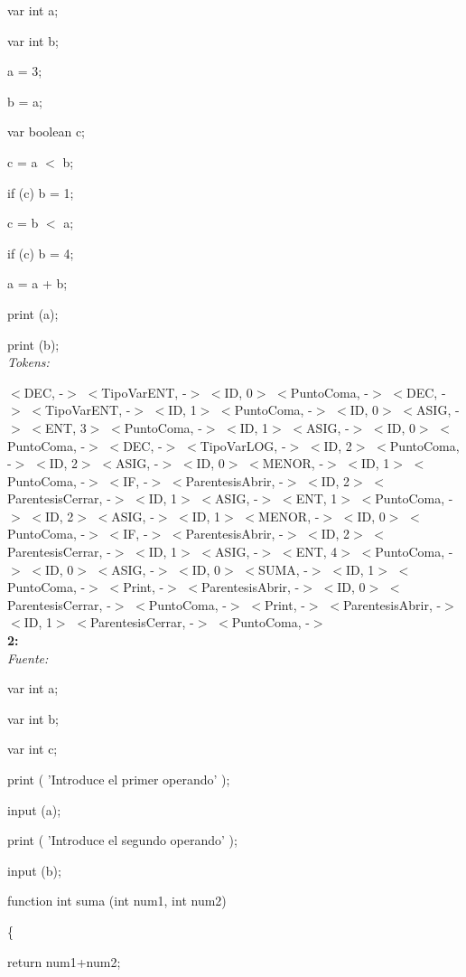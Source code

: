 \documentclass[a4paper, 12pt]{article}
\begin{document}
var int a;
 
var int b;

a = 3;

b = a;

 var boolean c;
 
c = a  $<$  b;

if (c) b  =  1;

c = b  $<$  a;

if (c) b  =  4;

 a = a  +  b;
 
print (a);

print (b);\medskip \\
\emph{Tokens:}

\smallskip 
 $<$DEC, -$>$ 
 $<$TipoVarENT, -$>$ 
 $<$ID, 0$>$ 
 $<$PuntoComa, -$>$ 
 $<$DEC, -$>$
 $<$TipoVarENT, -$>$ 
 $<$ID, 1$>$ 
 $<$PuntoComa, -$>$ 
 $<$ID, 0$>$ 
 $<$ASIG, -$>$ 
 $<$ENT, 3$>$ 
 $<$PuntoComa, -$>$ 
 $<$ID, 1$>$ 
 $<$ASIG, -$>$ 
 $<$ID, 0$>$ 
 $<$PuntoComa, -$>$ 
 $<$DEC, -$>$ 
 $<$TipoVarLOG, -$>$ 
 $<$ID, 2$>$ 
 $<$PuntoComa, -$>$ 
 $<$ID, 2$>$ 
 $<$ASIG, -$>$ 
 $<$ID, 0$>$ 
 $<$MENOR, -$>$ 
 $<$ID, 1$>$ 
 $<$PuntoComa, -$>$ 
 $<$IF, -$>$ 
 $<$ParentesisAbrir, -$>$ 
 $<$ID, 2$>$ 
 $<$ParentesisCerrar, -$>$ 
 $<$ID, 1$>$ 
 $<$ASIG, -$>$ 
 $<$ENT, 1$>$ 
 $<$PuntoComa, -$>$ 
 $<$ID, 2$>$ 
 $<$ASIG, -$>$ 
 $<$ID, 1$>$ 
 $<$MENOR, -$>$ 
 $<$ID, 0$>$ 
 $<$PuntoComa, -$>$ 
 $<$IF, -$>$ 
 $<$ParentesisAbrir, -$>$ 
 $<$ID, 2$>$ 
 $<$ParentesisCerrar, -$>$ 
 $<$ID, 1$>$ 
 $<$ASIG, -$>$ 
 $<$ENT, 4$>$ 
 $<$PuntoComa, -$>$ 
 $<$ID, 0$>$ 
 $<$ASIG, -$>$ 
 $<$ID, 0$>$ 
 $<$SUMA, -$>$ 
 $<$ID, 1$>$ 
 $<$PuntoComa, -$>$ 
 $<$Print, -$>$ 
 $<$ParentesisAbrir, -$>$ 
 $<$ID, 0$>$ 
 $<$ParentesisCerrar, -$>$ 
 $<$PuntoComa, -$>$ 
 $<$Print, -$>$ 
 $<$ParentesisAbrir, -$>$ 
 $<$ID, 1$>$ 
 $<$ParentesisCerrar, -$>$ 
 $<$PuntoComa, -$>$ \bigskip \\
\textbf{2:}\medskip\\
\emph{Fuente:}

var int a;

var int b;

var int c;

print ( 'Introduce el primer operando' );

input (a);

print ( 'Introduce el segundo operando' );

input (b);
 
 function int suma (int num1, int num2)

\{

	return num1+num2;
	
\end{document}
